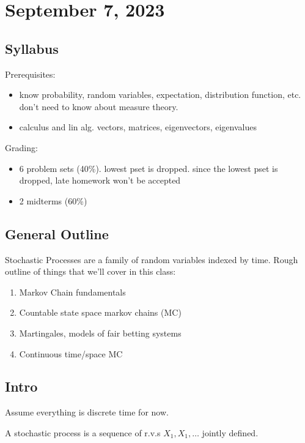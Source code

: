 \section{September 7, 2023}

\subsection{Syllabus}

Prerequisites: 

\begin{itemize}
    \item know probability, random variables, expectation, distribution function, etc. don't need to know about measure theory. 
    \item calculus and lin alg. vectors, matrices, eigenvectors, eigenvalues  
\end{itemize}

\noindent Grading: 

\begin{itemize}
    \item 6 problem sets (40\%). lowest pset is dropped. since the lowest pset is dropped, late homework won't be accepted
    \item 2 midterms (60\%)
\end{itemize}

\subsection{General Outline}

Stochastic Processes are a family of random variables indexed by time. Rough outline of things that we'll cover in this class: 
\begin{enumerate}
    \item Markov Chain fundamentals 
    \item Countable state space markov chains (MC)
    \item Martingales, models of fair betting systems
    \item Continuous time/space MC
\end{enumerate}

\subsection{Intro}

Assume everything is discrete time for now. 

\begin{definition}

A \ac{stochastic process} is a sequence of r.v.s $X_1, X_1, \hdots$ jointly defined. 
\end{definition}

